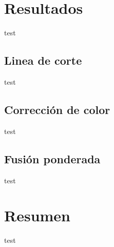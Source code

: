 \section{Resultados}
test
\subsection*{Linea de corte}
test

\subsection*{Corrección de color}
test

\subsection*{Fusión ponderada}
test

\section{Resumen}
test
